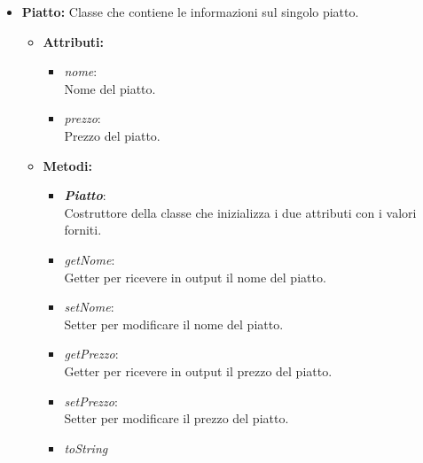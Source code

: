 \documentclass{article}
\begin{document}
\begin{itemize}
        \item \textbf{Piatto:} Classe che contiene le informazioni sul singolo piatto.
        
        \begin{itemize}
            \item \textbf{Attributi:}
            
                \begin{itemize}
                    \item \textit{nome}: \\ Nome del piatto. \\
                    \item \textit{prezzo}: \\ Prezzo del piatto. \\
                \end{itemize}
                
                \item \textbf{Metodi:}
            
            \begin{itemize}
                \item \textbf{\textit{Piatto}}: \\ Costruttore della classe che inizializza i due attributi con i valori forniti.\\
                \item \textit{getNome}: \\ Getter per ricevere in output il nome del piatto.\\
                \item \textit{setNome}: \\ Setter per modificare il nome del piatto.\\
                \item \textit{getPrezzo}: \\ Getter per ricevere in output il prezzo del piatto.\\
                \item \textit{setPrezzo}: \\ Setter per modificare il prezzo del piatto.\\
                \item \textit{toString} \\ 
             
            \end{itemize}
            
        \end{itemize}
        

\end{itemize}
\end{document}
